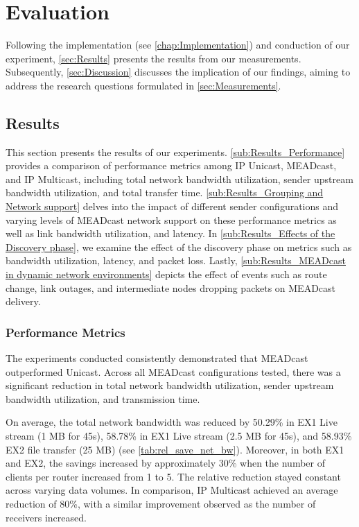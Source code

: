 \chapter{Evaluation} %
\label{chap:Evaluation}
Following the implementation (see \autoref{chap:Implementation}) and conduction
    of our experiment, \autoref{sec:Results} presents the results from our
    measurements.
Subsequently, \autoref{sec:Discussion} discusses the implication of our
    findings, aiming to address the research questions formulated in
    \autoref{sec:Measurements}.

\section{Results} %
\label{sec:Results}
This section presents the results of our experiments.
\autoref{sub:Results_Performance} provides a comparison of performance metrics among IP
    Unicast, MEADcast, and IP Multicast, including total network bandwidth
    utilization, sender upstream bandwidth utilization, and total transfer
    time.
\autoref{sub:Results_Grouping and Network support} delves into the impact of different
    sender configurations and varying levels of MEADcast network support on
    these performance metrics as well as link bandwidth utilization, and
    latency.
In \autoref{sub:Results_Effects of the Discovery phase}, we examine the effect of the
    discovery phase on metrics such as bandwidth utilization, latency, and
    packet loss.
Lastly, \autoref{sub:Results_MEADcast in dynamic network environments} depicts the
    effect of events such as route change, link outages, and intermediate nodes
    dropping packets on MEADcast delivery.
\subsection{Performance Metrics} %
\label{sub:Results_Performance}
The experiments conducted consistently demonstrated that MEADcast outperformed
    Unicast.
Across all MEADcast configurations tested, there was a significant reduction in
    total network bandwidth utilization, sender upstream bandwidth utilization,
    and transmission time.

On average, the total network bandwidth was reduced by 50.29\% in EX1 Live
    stream (1 MB for 45s), 58.78\% in EX1 Live stream (2.5 MB for 45s), and
    58.93\% EX2 file transfer (25 MB) (see \autoref{tab:rel_save_net_bw}).
Moreover, in both EX1 and EX2, the savings increased by approximately 30\%
    when the number of clients per router increased from 1 to 5.
The relative reduction stayed constant across varying data volumes.
In comparison, IP Multicast achieved an average reduction of 80\%, with a
    similar improvement observed as the number of receivers increased.

